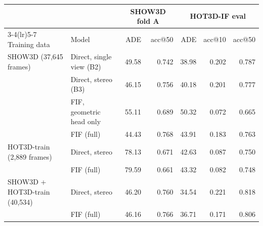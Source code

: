 \begin{tabular}{@{}llrrrrr@{}}
\toprule
 & & \multicolumn{2}{c}{SHOW3D fold A} & \multicolumn{3}{c}{HOT3D-IF eval} \\
\cmidrule(lr){3-4}\cmidrule(lr){5-7}
Training data & Model & ADE & acc@50 & ADE & acc@10 & acc@50 \\
\midrule
SHOW3D (37,645 frames) & Direct, single view (B2) & 49.58 & 0.742 & 38.98 & 0.202 & 0.787 \\
 & Direct, stereo (B3) & 46.15 & 0.756 & 40.18 & 0.201 & 0.777 \\
 & FIF, geometric head only & 55.11 & 0.689 & 50.32 & 0.072 & 0.665 \\
 & FIF (full) & 44.43 & 0.768 & 43.91 & 0.183 & 0.763 \\
\midrule
HOT3D-train (2,889 frames) & Direct, stereo & 78.13 & 0.671 & 42.63 & 0.087 & 0.750 \\
 & FIF (full) & 79.59 & 0.661 & 43.32 & 0.082 & 0.748 \\
\midrule
SHOW3D + HOT3D-train (40,534) & Direct, stereo & 46.20 & 0.760 & 34.54 & 0.221 & 0.818 \\
 & FIF (full) & 46.16 & 0.766 & 36.71 & 0.171 & 0.806 \\
\bottomrule
\end{tabular}
